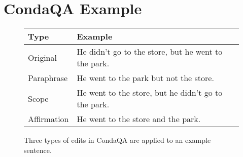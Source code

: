 \section{CondaQA Example}
\label{sec:condaqaexample}
\begin{figure}
  \small
  \begin{tabularx}{0.48 \textwidth}{lX}
      \toprule
      \textbf{Type} & \textbf{Example} \\
      \midrule
      Original & He didn't go to the store, but he went to the park. \\
      Paraphrase & He went to the park but not the store. \\
      Scope & He went to the store, but he didn't go to the park. \\
      Affirmation & He went to the store and the park. \\
      \bottomrule
  \end{tabularx}
  \caption{
      Three types of edits in CondaQA are applied to an example sentence.
      \label{fig:condaqaeditexample}
  }
\end{figure} 



